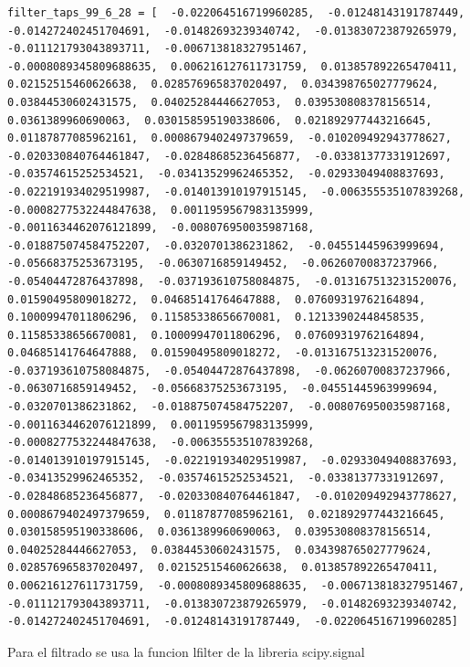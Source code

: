 \lstset{language=python, breaklines=true, basicstyle=\footnotesize}
\begin{lstlisting}[frame=single]
filter_taps_99_6_28 = [  -0.022064516719960285,  -0.01248143191787449,  -0.014272402451704691,  -0.01482693239340742,  -0.013830723879265979,  -0.011121793043893711,  -0.006713818327951467,  -0.0008089345809688635,  0.006216127611731759,  0.013857892265470411,  0.02152515460626638,  0.028576965837020497,  0.034398765027779624,  0.03844530602431575,  0.04025284446627053,  0.039530808378156514,  0.0361389960690063,  0.030158595190338606,  0.021892977443216645,  0.01187877085962161,  0.0008679402497379659,  -0.010209492943778627,  -0.020330840764461847,  -0.02848685236456877,  -0.03381377331912697,  -0.03574615252534521,  -0.03413529962465352,  -0.02933049408837693,  -0.022191934029519987,  -0.014013910197915145,  -0.006355535107839268,  -0.0008277532244847638,  0.0011959567983135999,  -0.0011634462076121899,  -0.008076950035987168,  -0.018875074584752207,  -0.0320701386231862,  -0.04551445963999694,  -0.05668375253673195,  -0.0630716859149452,  -0.06260700837237966,  -0.05404472876437898,  -0.037193610758084875,  -0.013167513231520076,  0.01590495809018272,  0.04685141764647888,  0.07609319762164894,  0.10009947011806296,  0.11585338656670081,  0.12133902448458535,  0.11585338656670081,  0.10009947011806296,  0.07609319762164894,  0.04685141764647888,  0.01590495809018272,  -0.013167513231520076,  -0.037193610758084875,  -0.05404472876437898,  -0.06260700837237966,  -0.0630716859149452,  -0.05668375253673195,  -0.04551445963999694,  -0.0320701386231862,  -0.018875074584752207,  -0.008076950035987168,  -0.0011634462076121899,  0.0011959567983135999,  -0.0008277532244847638,  -0.006355535107839268,  -0.014013910197915145,  -0.022191934029519987,  -0.02933049408837693,  -0.03413529962465352,  -0.03574615252534521,  -0.03381377331912697,  -0.02848685236456877,  -0.020330840764461847,  -0.010209492943778627,  0.0008679402497379659,  0.01187877085962161,  0.021892977443216645,  0.030158595190338606,  0.0361389960690063,  0.039530808378156514,  0.04025284446627053,  0.03844530602431575,  0.034398765027779624,  0.028576965837020497,  0.02152515460626638,  0.013857892265470411,  0.006216127611731759,  -0.0008089345809688635,  -0.006713818327951467,  -0.011121793043893711,  -0.013830723879265979,  -0.01482693239340742,  -0.014272402451704691,  -0.01248143191787449,  -0.022064516719960285]

\end{lstlisting}

Para el filtrado se usa la funcion lfilter de la libreria scipy.signal

